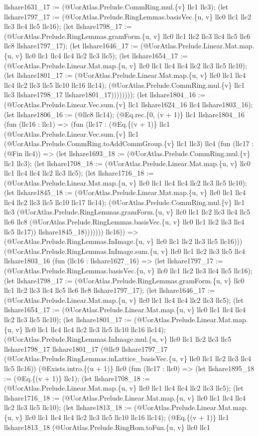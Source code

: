 \documentclass[11pt]{article}
\begin{document}
llshare1631\_17 := (@UorAtlas.Prelude.CommRing.mul.\{v\} llc1 llc3); (let llshare1797\_17 := (@UorAtlas.Prelude.RingLemmas.basisVec.\{u, v\} llc0 llc1 llc2 llc3 llc4 llc5 llc16); (let llshare1798\_17 := (@UorAtlas.Prelude.RingLemmas.gramForm.\{u, v\} llc0 llc1 llc2 llc3 llc4 llc5 llc6 llc8 llshare1797\_17); (let llshare1646\_17 := (@UorAtlas.Prelude.Linear.Mat.map.\{u, v\} llc0 llc1 llc4 llc4 llc2 llc3 llc5); (let llshare1654\_17 := (@UorAtlas.Prelude.Linear.Mat.map.\{u, v\} llc0 llc1 llc4 llc4 llc2 llc3 llc5 llc10); (let llshare1801\_17 := (@UorAtlas.Prelude.Linear.Mat.map.\{u, v\} llc0 llc1 llc4 llc4 llc2 llc3 llc5 llc10 llc16 llc14); (@UorAtlas.Prelude.CommRing.mul.\{v\} llc1 llc3 llshare1798\_17 llshare1801\_17)))))))); (let llshare1804\_16 := (@UorAtlas.Prelude.Linear.Vec.sum.\{v\} llc1 llshare1624\_16 llc4 llshare1803\_16); (let llshare1806\_16 := (@llc8 llc14); (@Eq.rec.\{0, (v + 1)\} llc1 llshare1804\_16 (fun (llc16 : llc1) => (fun (llc17 : (@Eq.\{(v + 1)\} llc1 (@UorAtlas.Prelude.Linear.Vec.sum.\{v\} llc1 (@UorAtlas.Prelude.CommRing.toAddCommGroup.\{v\} llc1 llc3) llc4 (fun (llc17 : (@Fin llc4)) => (let llshare1693\_18 := (@UorAtlas.Prelude.CommRing.mul.\{v\} llc1 llc3); (let llshare1708\_18 := (@UorAtlas.Prelude.Linear.Mat.map.\{u, v\} llc0 llc1 llc4 llc4 llc2 llc3 llc5); (let llshare1716\_18 := (@UorAtlas.Prelude.Linear.Mat.map.\{u, v\} llc0 llc1 llc4 llc4 llc2 llc3 llc5 llc10); (let llshare1845\_18 := (@UorAtlas.Prelude.Linear.Mat.map.\{u, v\} llc0 llc1 llc4 llc4 llc2 llc3 llc5 llc10 llc17 llc14); (@UorAtlas.Prelude.CommRing.mul.\{v\} llc1 llc3 (@UorAtlas.Prelude.RingLemmas.gramForm.\{u, v\} llc0 llc1 llc2 llc3 llc4 llc5 llc6 llc8 (@UorAtlas.Prelude.RingLemmas.basisVec.\{u, v\} llc0 llc1 llc2 llc3 llc4 llc5 llc17)) llshare1845\_18))))))) llc16)) => (@UorAtlas.Prelude.RingLemmas.InImage.\{u, v\} llc0 llc1 llc2 llc3 llc5 llc16))) (@UorAtlas.Prelude.RingLemmas.InImage.sum.\{u, v\} llc0 llc1 llc2 llc3 llc5 llc4 llshare1803\_16 (fun (llc16 : llshare1627\_16) => (let llshare1797\_17 := (@UorAtlas.Prelude.RingLemmas.basisVec.\{u, v\} llc0 llc1 llc2 llc3 llc4 llc5 llc16); (let llshare1798\_17 := (@UorAtlas.Prelude.RingLemmas.gramForm.\{u, v\} llc0 llc1 llc2 llc3 llc4 llc5 llc6 llc8 llshare1797\_17); (let llshare1646\_17 := (@UorAtlas.Prelude.Linear.Mat.map.\{u, v\} llc0 llc1 llc4 llc4 llc2 llc3 llc5); (let llshare1654\_17 := (@UorAtlas.Prelude.Linear.Mat.map.\{u, v\} llc0 llc1 llc4 llc4 llc2 llc3 llc5 llc10); (let llshare1801\_17 := (@UorAtlas.Prelude.Linear.Mat.map.\{u, v\} llc0 llc1 llc4 llc4 llc2 llc3 llc5 llc10 llc16 llc14); (@UorAtlas.Prelude.RingLemmas.InImage.mul.\{u, v\} llc0 llc1 llc2 llc3 llc5 llshare1798\_17 llshare1801\_17 (@llc9 llshare1797\_17 (@UorAtlas.Prelude.RingLemmas.inLattice\_basisVec.\{u, v\} llc0 llc1 llc2 llc3 llc4 llc5 llc16)) (@Exists.intro.\{(u + 1)\} llc0 (fun (llc17 : llc0) => (let llshare1895\_18 := (@Eq.\{(v + 1)\} llc1); (let llshare1708\_18 := (@UorAtlas.Prelude.Linear.Mat.map.\{u, v\} llc0 llc1 llc4 llc4 llc2 llc3 llc5); (let llshare1716\_18 := (@UorAtlas.Prelude.Linear.Mat.map.\{u, v\} llc0 llc1 llc4 llc4 llc2 llc3 llc5 llc10); (let llshare1813\_18 := (@UorAtlas.Prelude.Linear.Mat.map.\{u, v\} llc0 llc1 llc4 llc4 llc2 llc3 llc5 llc10 llc16 llc14); (@Eq.\{(v + 1)\} llc1 llshare1813\_18 (@UorAtlas.Prelude.RingHom.toFun.\{u, v\} llc0 llc1 
\end{document}
